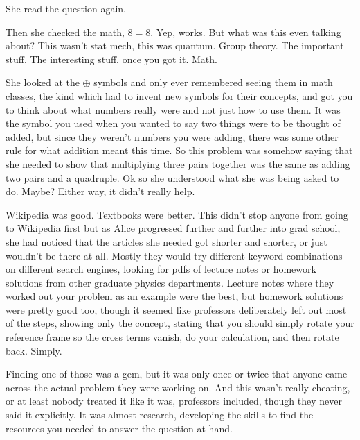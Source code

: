 \mypause 

She read the question again. 

\mypause
%

Then she checked the math, $8=8$. Yep, works. But what was this even talking about? This wasn't stat mech, this was quantum. Group theory. The important stuff. The interesting stuff, once you got it. Math. 

She looked at the $\oplus$ symbols and only ever remembered seeing them in math classes, the kind which had to invent new symbols for their concepts, and got you to think about what numbers really were and not just how to use them. It was the symbol you used when you wanted to say two things were to be thought of added, but since they weren't numbers you were adding, there was some other rule for what addition meant this time. So this problem was somehow saying that she needed to show that multiplying three pairs together was the same as adding two pairs and a quadruple. Ok so she understood what she was being asked to do. Maybe? Either way, it didn't really help.

Wikipedia was good. Textbooks were better. This didn't stop anyone from going to Wikipedia first but as Alice progressed further and further into grad school, she had noticed that the articles she needed got shorter and shorter, or just wouldn't be there at all. Mostly they would try different keyword combinations on different search engines, looking for pdfs of lecture notes or homework solutions from other graduate physics departments. Lecture notes where they worked out your problem as an example were the best, but homework solutions were pretty good too, though it seemed like professors deliberately left out most of the steps, showing only the concept, stating that you should simply rotate your reference frame so the cross terms vanish, do your calculation, and then rotate back. Simply.

Finding one of those was a gem, but it was only once or twice that anyone came across the actual problem they were working on. And this wasn't really cheating, or at least nobody treated it like it was, professors included, though they never said it explicitly. It was almost research, developing the skills to find the resources you needed to answer the question at hand. 


